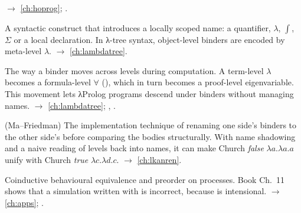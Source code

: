 \begin{glossarylist}
  $\rightarrow$ \cref{ch:hoprog}; .
\item[Binder] A syntactic construct that introduces a locally scoped name: a quantifier, $\lambda$, $\int$,
  $\Sigma$ or a local declaration. In λ-tree syntax, object-level binders are encoded by meta-level $\lambda$.
  $\rightarrow$ \cref{ch:lambdatree}.
\item[Binder mobility] The way a binder moves across levels during computation. A term-level $\lambda$ becomes a
  formula-level $\forall$ (), which in turn becomes a proof-level eigenvariable. This movement lets
  λProlog programs descend under binders without managing names. $\rightarrow$ \cref{ch:lambdatree};
  , .
\item[Binder-merging] (Ma--Friedman) The implementation technique of renaming one side's binders to the other
  side's before comparing the bodies structurally. With name shadowing and a naive reading of levels back into
  names, it can make Church \emph{false} $\lambda a.\lambda a.a$ unify with Church \emph{true}
  $\lambda c.\lambda d.c$. $\rightarrow$ \cref{ch:lkanren}.
\item[Bisimulation, simulation] Coinductive behavioural equivalence and preorder on processes. Book Ch.~11 shows
  that a simulation written with  is incorrect, because  is intensional.
  $\rightarrow$ \cref{ch:apps}; .
\end{glossarylist}

